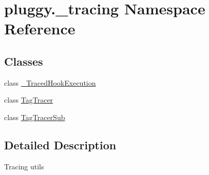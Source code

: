 \hypertarget{namespacepluggy_1_1__tracing}{}\section{pluggy.\+\_\+tracing Namespace Reference}
\label{namespacepluggy_1_1__tracing}
\subsection*{Classes}
\begin{DoxyCompactItemize}
\item 
class \hyperlink{classpluggy_1_1__tracing_1_1___traced_hook_execution}{\+\_\+\+Traced\+Hook\+Execution}
\item 
class \hyperlink{classpluggy_1_1__tracing_1_1_tag_tracer}{Tag\+Tracer}
\item 
class \hyperlink{classpluggy_1_1__tracing_1_1_tag_tracer_sub}{Tag\+Tracer\+Sub}
\end{DoxyCompactItemize}


\subsection{Detailed Description}
\begin{DoxyVerb}Tracing utils
\end{DoxyVerb}
 